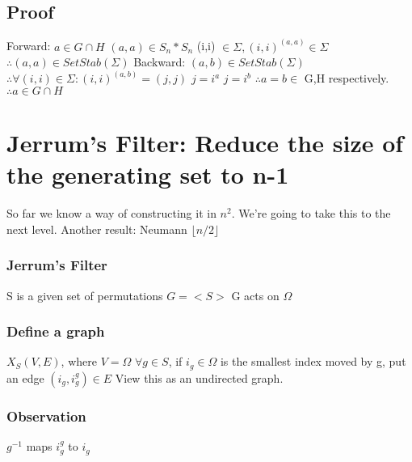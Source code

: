 \subsection{Proof}
Forward:\newline
	$a \in G \cap H$\newline
	$(a,a) \in S_n*S_n$\newline
	(i,i) $\in \Sigma, (i,i)^{(a,a) } \in \Sigma$\newline
	$\therefore (a,a) \in SetStab(\Sigma)$\newline\newline
Backward:\newline
	$(a,b) \in SetStab(\Sigma)$\newline
	$\therefore \forall (i,i) \in \Sigma:(i,i)^{(a,b)}=(j,j)$\newline
	$j=i^a$\newline
	$j=i^b$\newline
	$\therefore a=b \in$ G,H respectively.\newline
	$\therefore a \in G \cap H$\newline


\section{Jerrum's Filter: Reduce the size of the generating set to n-1}
So far we know a way of constructing it in $n^2$. We're going to take this to the next level.
Another result: Neumann $\lfloor n/2 \rfloor$

\subsubsection{Jerrum's Filter}
S is a given set of permutations\newline
$G = <S>$\newline
G acts on $\Omega$

\subsubsection{Define a graph}
$X_S (V,E)$, where $V=\Omega$\newline
$\forall g \in S$, if $i_g \in \Omega$  is the smallest index moved by g, put an edge $(i_g,i_g^g ) \in E$\newline
View this as an undirected graph.

\subsubsection{Observation}
$g^{-1}$  maps $i_g^g$  to $i_g$

